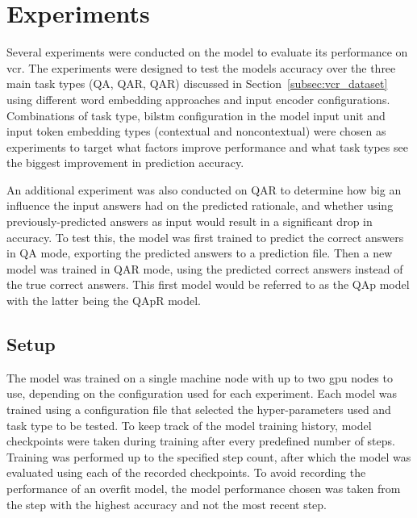 \section{Experiments}
\label{sec:experiments}

Several experiments were conducted on the model to evaluate its performance on \gls{vcr}.
The experiments were designed to test the models accuracy over the three main task types (Q\rightarrow{}A, QA\rightarrow{}R, Q\rightarrow{}AR) discussed in Section~\ref{subsec:vcr_dataset} using different word embedding approaches and input encoder configurations.
Combinations of task type, \gls{bilstm} configuration in the model input unit and input token embedding types (contextual and noncontextual) were chosen as experiments to target what factors improve performance and what task types see the biggest improvement in prediction accuracy.

An additional experiment was also conducted on QA\rightarrow{}R to determine how big an influence the input answers had on the predicted rationale, and whether using previously-predicted answers as input would result in a significant drop in accuracy.
To test this, the model was first trained to predict the correct answers in Q\rightarrow{}A mode, exporting the predicted answers to a prediction file.
Then a new model was trained in QA\rightarrow{}R mode, using the predicted correct answers instead of the true correct answers.
This first model would be referred to as the Q\rightarrow{}Ap model with the latter being the QAp\rightarrow{}R model.

\subsection{Setup}
\label{subsec:experiment-setup}

The model was trained on a single machine node with up to two \acrshort{gpu} nodes to use, depending on the configuration used for each experiment.
Each model was trained using a configuration file that selected the hyper-parameters used and task type to be tested.
To keep track of the model training history, model checkpoints were taken during training after every predefined number of steps.
Training was performed up to the specified step count, after which the model was evaluated using each of the recorded checkpoints.
To avoid recording the performance of an overfit model, the model performance chosen was taken from the step with the highest accuracy and not the most recent step.


